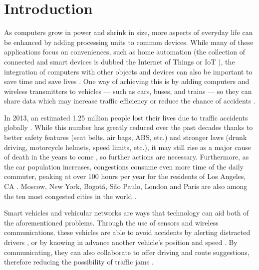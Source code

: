 \chapter{Introduction} 	
\label{chap:introduction}




As computers grow in power and shrink in size, more aspects of everyday life can be enhanced by adding processing units to common devices.
While many of these applications focus on conveniences, such as home automation \citep{mccole2016} (the collection of connected and smart devices is dubbed the Internet of Things or IoT \citep{morgan2014}), the integration of computers with other objects and devices can also be important to save time and save lives \citep{rti2014}.
One way of achieving this is by adding computers and wireless transmitters to vehicles — such as cars, buses, and trains — so they can share data which may increase traffic efficiency or reduce the chance of accidents \citep{saini2015close}.

In 2013, an estimated 1.25 million people lost their lives due to traffic accidents globally \citep{whotraffic}.
While this number has greatly reduced over the past decades \citep{johnson2010traffic} \citep{iihsfatality} thanks to better safety features (seat belts, air bags, ABS, etc.) and stronger laws (drunk driving, motorcycle helmets, speed limits, etc.), it may still rise as a major cause of death in the years to come \citep{whofactsheet}, so further actions are necessary.
Furthermore, as the car population increases, congestions consume even more time of the daily commuter, peaking at over 100 hours per year for the residents of Los Angeles, CA \citep{inrixtraffic}.
Moscow, New York, Bogotá, São Paulo, London and Paris are also among the ten most congested cities in the world \citep{inrixtraffic}.

Smart vehicles and vehicular networks are ways that technology can aid both of the aforementioned problems.
Through the use of sensors and wireless communications, these vehicles are able to avoid accidents by alerting distracted drivers \citep{lee2004collision}, or by knowing in advance another vehicle's position and speed \citep{hafner2011automated}.
By communicating, they can also collaborate to offer driving and route suggestions, therefore reducing the possibility of traffic jams \citep{knorr2012reducing}.

